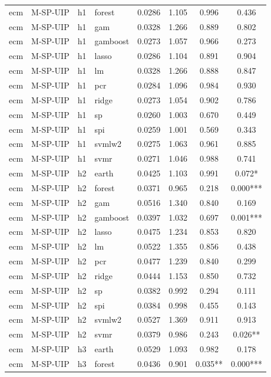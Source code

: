 \begin{ThreePartTable}
\begin{longtable}[t]{llclcccc}
ecm & M-SP-UIP & h1 & forest & 0.0286 & 1.105 & 0.996 & 0.436\\
ecm & M-SP-UIP & h1 & gam & 0.0328 & 1.266 & 0.889 & 0.802\\
ecm & M-SP-UIP & h1 & gamboost & 0.0273 & 1.057 & 0.966 & 0.273\\
ecm & M-SP-UIP & h1 & lasso & 0.0286 & 1.104 & 0.891 & 0.904\\
ecm & M-SP-UIP & h1 & lm & 0.0328 & 1.266 & 0.888 & 0.847\\
ecm & M-SP-UIP & h1 & pcr & 0.0284 & 1.096 & 0.984 & 0.930\\
ecm & M-SP-UIP & h1 & ridge & 0.0273 & 1.054 & 0.902 & 0.786\\
ecm & M-SP-UIP & h1 & sp & 0.0260 & 1.003 & 0.670 & 0.449\\
ecm & M-SP-UIP & h1 & spi & 0.0259 & 1.001 & 0.569 & 0.343\\
ecm & M-SP-UIP & h1 & svmlw2 & 0.0275 & 1.063 & 0.961 & 0.885\\
ecm & M-SP-UIP & h1 & svmr & 0.0271 & 1.046 & 0.988 & 0.741\\
\addlinespace
ecm & M-SP-UIP & h2 & earth & 0.0425 & 1.103 & 0.991 & 0.072*\\
ecm & M-SP-UIP & h2 & forest & 0.0371 & 0.965 & 0.218 & 0.000***\\
ecm & M-SP-UIP & h2 & gam & 0.0516 & 1.340 & 0.840 & 0.169\\
ecm & M-SP-UIP & h2 & gamboost & 0.0397 & 1.032 & 0.697 & 0.001***\\
ecm & M-SP-UIP & h2 & lasso & 0.0475 & 1.234 & 0.853 & 0.820\\
ecm & M-SP-UIP & h2 & lm & 0.0522 & 1.355 & 0.856 & 0.438\\
ecm & M-SP-UIP & h2 & pcr & 0.0477 & 1.239 & 0.840 & 0.299\\
ecm & M-SP-UIP & h2 & ridge & 0.0444 & 1.153 & 0.850 & 0.732\\
ecm & M-SP-UIP & h2 & sp & 0.0382 & 0.992 & 0.294 & 0.111\\
ecm & M-SP-UIP & h2 & spi & 0.0384 & 0.998 & 0.455 & 0.143\\
ecm & M-SP-UIP & h2 & svmlw2 & 0.0527 & 1.369 & 0.911 & 0.913\\
ecm & M-SP-UIP & h2 & svmr & 0.0379 & 0.986 & 0.243 & 0.026**\\
\addlinespace
ecm & M-SP-UIP & h3 & earth & 0.0529 & 1.093 & 0.982 & 0.178\\
ecm & M-SP-UIP & h3 & forest & 0.0436 & 0.901 & 0.035** & 0.000***\\

\end{longtable}
\end{ThreePartTable}
